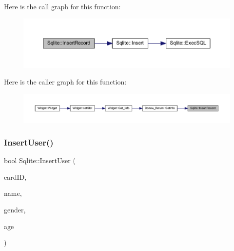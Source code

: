 Here is the call graph for this function\+:
\nopagebreak
\begin{figure}[H]
\begin{center}
\leavevmode
\includegraphics[width=350pt]{class_sqlite_a278f03d5b8e7f6dba8e97d3d5310c4b5_cgraph}
\end{center}
\end{figure}
Here is the caller graph for this function\+:
\nopagebreak
\begin{figure}[H]
\begin{center}
\leavevmode
\includegraphics[width=350pt]{class_sqlite_a278f03d5b8e7f6dba8e97d3d5310c4b5_icgraph}
\end{center}
\end{figure}
\mbox{\label{class_sqlite_a950aea188ad2f7285032756cfe0ecc6d}} 
\subsubsection{\texorpdfstring{InsertUser()}{InsertUser()}}
{\footnotesize\ttfamily bool Sqlite\+::\+Insert\+User (\begin{DoxyParamCaption}\item[{Q\+String}]{card\+ID,  }\item[{Q\+String}]{name,  }\item[{Q\+String}]{gender,  }\item[{int}]{age }\end{DoxyParamCaption})}

